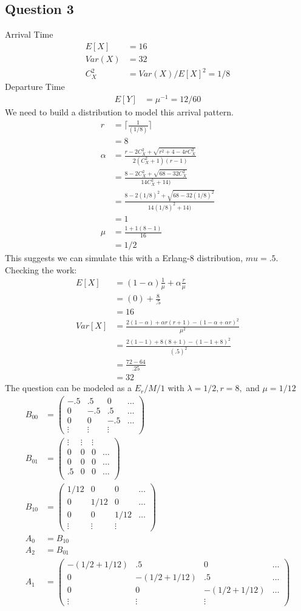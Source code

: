 \documentclass[fleqn]{article}
\newcommand{\mm}[1]{\begin{pmatrix}#1\end{pmatrix}}
\newcommand{\nn}[1]{ \begin{align*}#1\end{align*}}
\begin{document}
\subsection*{Question 3}
Arrival Time 
\nn{
	E[X] 	&= 16 \\
	Var(X) 	&= 32 \\
	C^2_X 	&= Var(X)/E[X]^2 = 1/8 
}
Departure Time
\nn{
	E[Y] 	&= \mu^{-1} = 12/60 
}
We need to build a distribution to model this arrival pattern.
\nn{
	r 		&= \lceil \frac{1}{(1/8)} \rceil\\
			&= \boxed{8}\\
	\alpha 	&=\frac{r - 2C_X^2 + \sqrt{r^2 + 4 -4rC_X^2}}{2(C_X^2 + 1)(r-1)}\\
			&=\frac{8 - 2C_X^2 + \sqrt{68 -32C_X^2}}{14C_X^2 + 14)} \\
			&=\frac{8 - 2(1/8)^2 + \sqrt{68 -32(1/8)^2}}{14(1/8)^2 + 14)} \\
			&= \boxed{1}\\
	\mu 	&= \frac{1 + 1(8-1)}{16}\\
			&= \boxed{1/2}
}
This suggests we can simulate this with a Erlang-8 distribution, $mu = .5$.\\
Checking the work:
\nn{
	E[X]	&= (1-\alpha)\frac{1}{\mu} + \alpha\frac{r}{\mu}\\
			&= (0) + \frac{8}{.5}\\
			&= 16\\
	Var[X] 	&= \frac{2(1-\alpha)+\alpha r(r+1)-(1-\alpha+\alpha r)^2}{\mu^2}\\
			&= \frac{2(1-1)+ 8(8+1)-(1-1+8)^2}{(.5)^2} \\
			&= \frac{72 - 64}{.25}\\
			&= 32
	}
The question can be modeled as a $E_r/M/1$ with $\lambda = 1/2, r = 8,$ and $
\mu = 1/12$ 
\nn{
	B_{00} &= \mm{
		-.5 & .5& 0 &\ldots\\
		0 & -.5& .5 &\ldots\\
		0 & 0& -.5 &\ldots\\	
		\vdots&\vdots&\vdots&	
	}\\
	B_{01} &= \mm{
		\vdots&\vdots&\vdots&\\
		0&0&0&\ldots\\
		0&0&0&\ldots\\
		.5&0&0&\ldots\\
	}\\
	B_{10} &=\mm{
		1/12 & 0 & 0 &\ldots\\
		0 & 1/12 & 0 &\ldots\\
		0 & 0& 1/12 &\ldots\\	
		\vdots&\vdots&\vdots&	
	}\\
	A_0 &= B_{10}\\
	A_2 &= B_{01}\\
	A_1 &= \mm{
		-(1/2+1/12) & .5& 0 &\ldots\\
		0 & -(1/2+1/12)& .5 &\ldots\\
		0 & 0& -(1/2+1/12) &\ldots\\	
		\vdots&\vdots&\vdots&	
	}
}
\end{document}
